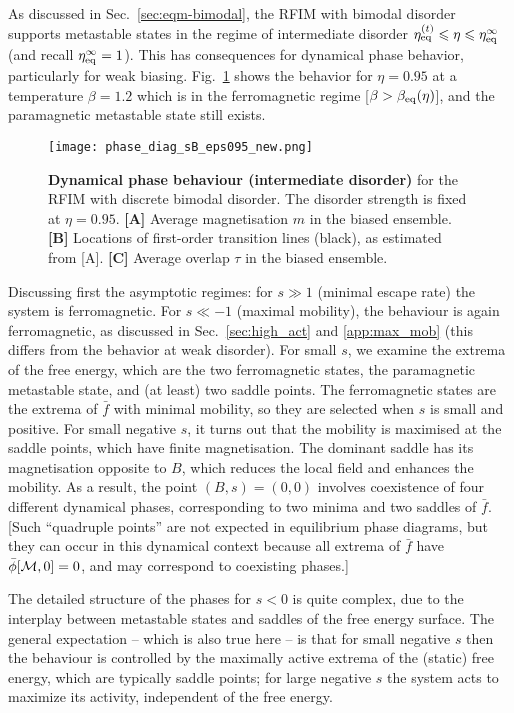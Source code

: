 \documentclass{iopart}
\begin{document}
As discussed in Sec.~\ref{sec:eqm-bimodal}, the RFIM with bimodal disorder supports metastable states in the 
regime of intermediate disorder $\eta_{\rm eq}^{(t)} \leqslant \eta \leqslant \eta_{\rm eq}^{\infty}$ (and recall $\eta_{\rm eq}^{\infty}=1$).  This has consequences for dynamical phase behavior, particularly for weak biasing.  
Fig.~\ref{fig:5} shows the behavior for $\eta=0.95$ at a temperature $\beta=1.2$ which is in the ferromagnetic regime [$\beta>\beta_{\rm eq}(\eta)$], and the paramagnetic metastable state still exists.  

\begin{figure}
  \centering
  \texttt{[image: phase\_diag\_sB\_eps095\_new.png]}
  \caption{
  \textbf{Dynamical phase behaviour (intermediate disorder)} for the RFIM with discrete bimodal disorder. The disorder strength is fixed at $\eta=0.95$. \textbf{[A]} Average magnetisation $m$ in the biased ensemble. 
  \textbf{[B]} Locations of first-order transition lines (black), as estimated from [A]. 
  \textbf{[C]} Average overlap $\tau$ in the biased ensemble.}
  \label{fig:5}
\end{figure}

Discussing first the asymptotic regimes: for $s\gg 1$ (minimal escape rate) the system is ferromagnetic.  For $s\ll -1$ (maximal mobility), the behaviour is again ferromagnetic, as discussed in Sec.~\ref{sec:high_act} and \ref{app:max_mob} (this differs from the behavior at weak disorder).  For small $s$, we examine the extrema of the free energy, which are the two ferromagnetic states, the paramagnetic metastable state, and (at least) two saddle points.  The ferromagnetic states are the extrema of $\bar{f}$ with minimal mobility, so they are selected when $s$ is small and positive.  For small negative $s$, it turns out that the mobility is maximised at the saddle points, which have finite magnetisation. The dominant saddle has its magnetisation opposite to $B$, which reduces the local field and enhances the mobility.  As a result, the point $(B,s)=(0,0)$ involves coexistence of four different dynamical phases, corresponding to two minima and two saddles of $\bar f$.  
[Such ``quadruple points'' are not expected in equilibrium phase diagrams, but they can occur in this dynamical context because all extrema of $\bar f$ have $\bar\phi[{\cal M},0]=0$, and may correspond to coexisting phases.]

The detailed structure of the phases for $s<0$ is quite complex, due to the interplay between metastable states and saddles of the free energy surface.  The general expectation -- which is also true here -- is that for small negative $s$ then the behaviour is controlled by the  maximally active extrema of the (static) free energy, which are typically saddle points; for large negative $s$ the system acts to maximize its activity, independent of the free energy.
\end{document}

